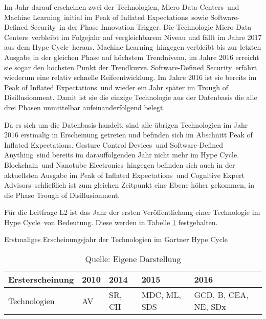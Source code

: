 Im Jahr darauf erscheinen zwei der Technologien, \glqq Micro Data Centers\grqq~und \glqq Machine Learning\grqq~initial im \glqq Peak of Inflated Expectations\grqq~sowie \glqq Software-Defined Security\grqq~in der Phase \glqq Innovation Trigger\grqq. Die Technologie \glqq Micro Data Centers\grqq~verbleibt im Folgejahr auf vergleichbarem Niveau und fällt im Jahre 2017 aus dem \glqq Hype Cycle\grqq~heraus. \glqq Machine Learning\grqq~hingegen verbleibt bis zur letzten Ausgabe in der gleichen Phase auf höchstem Trendniveau, im Jahre 2016 erreicht sie sogar den höchsten Punkt der Trendkurve. \glqq Software-Defined Security\grqq~erfährt wiederum eine relativ schnelle Reife\-entwicklung. Im Jahre 2016 ist sie bereits im \glqq Peak of Inflated Expectations\grqq~und wieder ein Jahr später im \glqq Trough of Disillusionment\grqq. Damit ist sie die einzige Technologie aus der Datenbasis die alle drei Phasen unmittelbar aufeinanderfolgend belegt.

Da es sich um die Datenbasis handelt, sind alle übrigen Technologien im Jahr 2016 erstmalig in Erscheinung getreten und befinden sich im Abschnitt \glqq Peak of Inflated Expectations\grqq. \glqq Gesture Control Devices\grqq~und \glqq Software-Defined Anything\grqq~sind bereits im darauffolgenden Jahr nicht mehr im \glqq Hype Cycle\grqq. \glqq Blockchain\grqq~und \glqq Nanotube Electronics\grqq~hingegen befinden sich auch in der aktuellsten Ausgabe im \glqq Peak of Inflated Expectations\grqq~und \glqq Cognitive Expert Advisors\grqq~schließlich ist zum gleichen Zeitpunkt eine Ebene höher gekommen, in die Phase \glqq Trough of Disillusionment\grqq.

Für die Leitfrage L2 ist das Jahr der ersten Veröffentlichung einer Technologie im \glqq Hype Cycle\grqq~von Bedeutung. Diese werden in Tabelle \ref{tab:ghc_init} festgehalten.

\begin{table}
	\caption{Erstmaliges Erscheinungsjahr der Technologien im \glqq Gartner Hype Cycle\grqq}
	\selectfont
	\centering
	\label{tab:ghc_init}
	\begin{tabularx}{\linewidth}{X|p{3em}XXX}
	Erst\-erscheinung & 2010 & 2014 & 2015 & 2016 \\
	\hline
	Technologien & \acs{AV} & \acs{SR}, \acs{CH} & \acs{MDC}, \acs{ML}, \acs{SDS} & \acs{GCD}, \acs{B}, \acs{CEA}, \acs{NE}, \acs{SDx} \\
	\end{tabularx}
	\caption*{Quelle: Eigene Darstellung}
\end{table}

